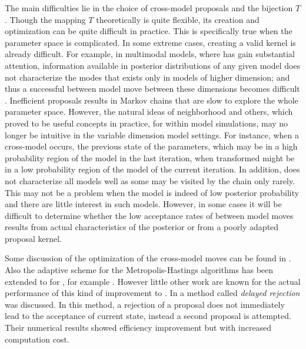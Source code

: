 The main difficulties lie in the choice of cross-model proposals and the
bijection $T$. Though the mapping $T$ theoretically is quite flexible, its
creation and optimization can be quite difficult in practice. This is
specifically true when the parameter space is complicated. In some extreme
cases, creating a valid kernel is already difficult. For example, in
multimodal models, where \rjmcmc has gain substantial attention, information
available in posterior distributions of any given model does not characterize
the modes that exists only in models of higher dimension; and thus a
successful between model move between these dimensions becomes difficult
\cite{Jasra:2007id}. Inefficient proposals results in Markov chains that are
slow to explore the whole parameter space. However, the natural ideas of
neighborhood and others, which proved to be useful concepts in practice, for
within model simulations, may no longer be intuitive in the variable dimension
model settings. For instance, when a cross-model occurs, the previous state of
the parameters, which may be in a high probability region of the model in the
last iteration, when transformed might be in a low probability region of the
model of the current iteration. In addition, \rjmcmc does not characterize all
models well as some may be visited by the chain only rarely. This may not be a
problem when the model is indeed of low posterior probability and there are
little interest in such models. However, in some cases it will be difficult to
determine whether the low acceptance rates of between model moves results from
actual characteristics of the posterior or from a poorly adapted proposal
kernel.


Some discussion of the optimization of the cross-model moves can be found in
\cite{Green:2009tr}. Also the adaptive scheme for the Metropolis-Hastings
algorithms has been extended to for \rjmcmc, for example \cite{Hastie:2005vi}.
However little other work are known for the actual performance of this kind of
improvement to \rjmcmc. In \cite{Green:2001tk} a method called \emph{delayed
  rejection} was discussed. In this method, a rejection of a proposal does not
immediately lead to the acceptance of current state, instead a second proposal
is attempted. Their numerical results showed efficiency improvement but with
increased computation cost.

